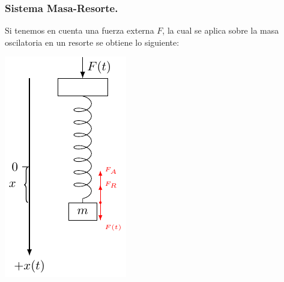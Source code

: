 \documentclass{beamer}
\begin{document}
\begin{frame}[t]
	\frametitle{Sistema Masa-Resorte.}
	\begin{block}{}
		Si tenemos en cuenta una fuerza externa \(F\), la cual se aplica sobre la masa oscilatoria en un resorte se obtiene lo siguiente:\\[3mm]
		\begin{minipage}{0.3\linewidth}
			\includegraphics[width= \linewidth]{IMAGENES/6/tikz.pdf}

\end{minipage}
\end{block}
\end{frame}
\end{document}
